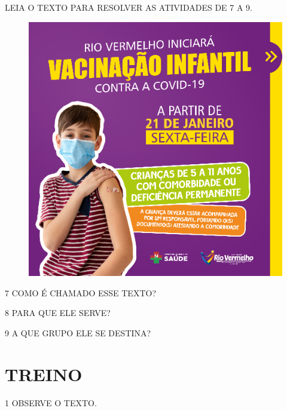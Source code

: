 LEIA O TEXTO PARA RESOLVER AS ATIVIDADES DE 7 A 9.

\begin{figure}[H]
\centering
\includegraphics[width=\textwidth]{media/image156.png}
\end{figure}


\num{7} COMO É CHAMADO ESSE TEXTO?


\num{8} PARA QUE ELE SERVE?


\num{9} A QUE GRUPO ELE SE DESTINA?


\section*{TREINO}


\num{1} OBSERVE O TEXTO.

